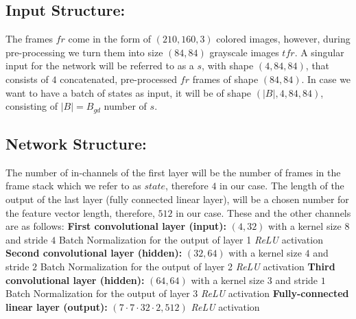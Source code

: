 \documentclass{article}
\begin{document}
\subsection{Input Structure:}
 The frames $fr$ come in the form of $(210, 160, 3)$ colored images, however, during pre-processing we turn them into size $(84,84)$ grayscale images $tfr$. A singular input for the network will be referred to as a $s$, with shape $(4,84,84)$, that consists of $4$ concatenated, pre-processed $fr$ frames of shape $(84,84)$. In case we want to have a batch of states as input, it will be of shape $(|B|,4,84,84)$, consisting of $|B| = B_{gd}$ number of $s$.
\subsection{Network Structure:}

\begin{algorithmic}[H]

\State The number of in-channels of the first layer will be the number of frames in the frame stack which we refer to as $state$, therefore $4$ in our case.
\State The length of the output of the last layer (fully connected linear layer), will be a chosen number for the feature vector length, therefore, $512$ in our case.
\State These and the other channels are as follows:
\State \textbf{First convolutional layer (input):} $(4, 32)$ with a kernel size $8$ and stride $4$
\State Batch Normalization for the output of layer 1
\State \textit{ReLU} activation
\State \textbf{Second convolutional layer (hidden):} $(32, 64)$ with a kernel size $4$ and stride $2$
\State Batch Normalization for the output of layer 2
\State \textit{ReLU} activation
\State \textbf{Third convolutional layer (hidden):} $(64, 64)$ with a kernel size $3$ and stride $1$
\State Batch Normalization for the output of layer 3
\State \textit{ReLU} activation
\State \textbf{Fully-connected linear layer (output):} $(7\cdot7\cdot32\cdot2,512)$
\State \textit{ReLU} activation

\end{algorithmic}
\end{document}
